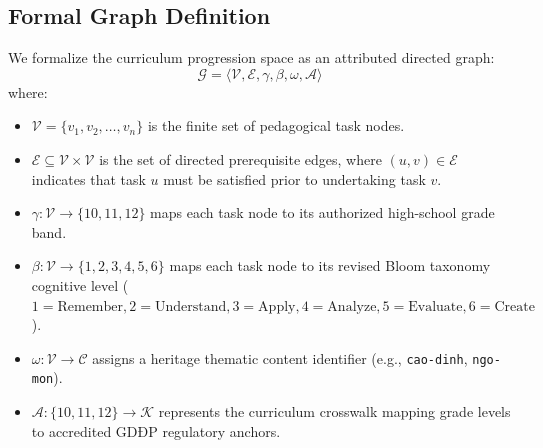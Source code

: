 \documentclass[11pt,a4paper]{article}
\begin{document}
\subsection{Formal Graph Definition}

We formalize the curriculum progression space as an attributed directed graph:
\begin{equation}
\mathcal{G} = \langle \mathcal{V}, \mathcal{E}, \gamma, \beta, \omega, \mathcal{A} \rangle
\end{equation}
where:
\begin{itemize}
    \item $\mathcal{V} = \{v_1, v_2, \dots, v_n\}$ is the finite set of pedagogical task nodes.
    \item $\mathcal{E} \subseteq \mathcal{V} \times \mathcal{V}$ is the set of directed prerequisite edges, where $(u, v) \in \mathcal{E}$ indicates that task $u$ must be satisfied prior to undertaking task $v$.
    \item $\gamma: \mathcal{V} \to \{10, 11, 12\}$ maps each task node to its authorized high-school grade band.
    \item $\beta: \mathcal{V} \to \{1, 2, 3, 4, 5, 6\}$ maps each task node to its revised Bloom taxonomy cognitive level ($1=\text{Remember}, 2=\text{Understand}, 3=\text{Apply}, 4=\text{Analyze}, 5=\text{Evaluate}, 6=\text{Create}$).
    \item $\omega: \mathcal{V} \to \mathcal{C}$ assigns a heritage thematic content identifier (e.g., \texttt{cao-dinh}, \texttt{ngo-mon}).
    \item $\mathcal{A}: \{10, 11, 12\} \to \mathcal{K}$ represents the curriculum crosswalk mapping grade levels to accredited GDĐP regulatory anchors.
\end{itemize}
\end{document}
